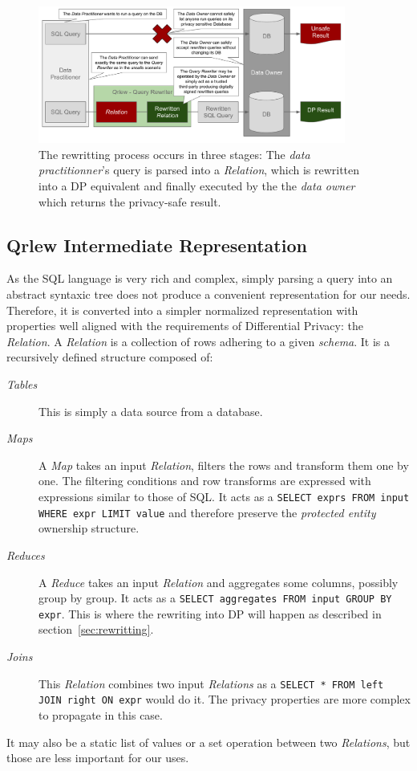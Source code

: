 \documentclass[letterpaper]{article} %
\begin{document}
\begin{figure}[t]
    \centering
    \includegraphics[width=0.9\textwidth]{figures/qrlew_process} %
    \caption{The rewritting process occurs in three stages: The \emph{data practitionner}'s query is parsed into a \emph{Relation}, which is rewritten into a DP equivalent and finally executed by the the \emph{data owner} which returns the privacy-safe result.}
    \label{fig:process}
\end{figure}

\subsection{Qrlew Intermediate Representation}

As the SQL language is very rich and complex, simply parsing a query into an abstract syntaxic tree does not produce a convenient representation for our needs. Therefore, it is converted into a simpler normalized representation with properties well aligned with the requirements of Differential Privacy: the \emph{Relation}. A \emph{Relation} is a collection of rows adhering to a given \emph{schema}. It is a recursively defined structure composed of:
\begin{description}
    \item[\emph{Tables}] This is simply a data source from a database.
    \item[\emph{Maps}] A \emph{Map} takes an input \emph{Relation}, filters the rows and transform them one by one. The filtering conditions and row transforms are expressed with expressions similar to those of SQL. It acts as a \texttt{SELECT exprs FROM input WHERE expr LIMIT value} and therefore preserve the \emph{protected entity} ownership structure.
    \item[\emph{Reduces}] A \emph{Reduce} takes an input \emph{Relation} and aggregates some columns, possibly group by group. It acts as a \texttt{SELECT aggregates FROM input GROUP BY expr}. This is where the rewriting into DP will happen as described in section~\ref{sec:rewritting}.
    \item[\emph{Joins}] This \emph{Relation} combines two input \emph{Relations} as a \texttt{SELECT * FROM left JOIN right ON expr} would do it. The privacy properties are more complex to propagate in this case.
\end{description}
It may also be a static list of values or a set operation between two \emph{Relations}, but those are less important for our uses.
\end{document}
